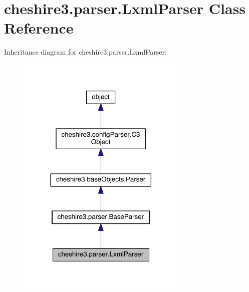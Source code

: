 \hypertarget{classcheshire3_1_1parser_1_1_lxml_parser}{\section{cheshire3.\-parser.\-Lxml\-Parser Class Reference}
\label{classcheshire3_1_1parser_1_1_lxml_parser}
}


Inheritance diagram for cheshire3.\-parser.\-Lxml\-Parser\-:
\nopagebreak
\begin{figure}[H]
\begin{center}
\leavevmode
\includegraphics[width=230pt]{classcheshire3_1_1parser_1_1_lxml_parser__inherit__graph}
\end{center}
\end{figure}


